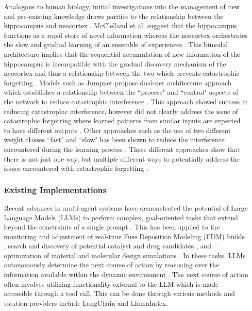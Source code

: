 Analogous to human biology, initial investigations into the management of new
and pre-existing knowledge draws parities to the relationship between the
hippocampus and neocortex \cite{mcclelland_why_1995, french_catastrophic_1999}.
McClelland et al. \cite{mcclelland_why_1995} suggest that the hippocampus
functions as a rapid store of novel information whereas the neocortex
orchestrates the slow and gradual learning of an ensemble of experiences
\cite{mcclelland_why_1995}. This bimodal architecture implies that the
sequential accumulation of new information of the hippocampus is incompatible
with the gradual discovery mechanism of the neocortex and thus a relationship
between the two which prevents catastrophic forgetting
\cite{mcclelland_why_1995, french_catastrophic_1999}. Models such as Jumpnet
\cite{rueckl_jumpnet_1993} propose dual-net architecture approach which
establishes a relationship between the ``process" and ``control" aspects of the
network to reduce catastrophic interference \cite{french_catastrophic_1999}.
This approach showed success in reducing catastrophic interference, however did
not clearly address the issue of catastrophic forgetting where learned patterns
from similar inputs are expected to have different outputs
\cite{french_catastrophic_1999}. Other approaches such as the use of two
different weight classes ``fast" and ``slow" has been shown to reduce the
interference encountered during the learning process \cite{hinton_using_1987,
french_catastrophic_1999}. These different approaches show that there is not
just one way, but multiple different ways to potentially address the issues
encountered with catastrophic forgetting \cite{french_catastrophic_1999}.

\subsubsection{Existing Implementations}
Recent advances in multi-agent systems have demonstrated the potential of Large
Language Models (LLMs) to perform complex, goal-oriented tasks that extend
beyond the constraints of a single prompt \cite{jadhav_llm-3d_2025,
ock_catalyst_2023, ock_large_2025, chaudhari_modular_2026, george_llm_2025,
bartsch_llm-craft_2025, chandrasekhar_automating_2025, merrill_llm-drone_2025}.
This has been applied to the monitoring and adjustment of real-time Fuse
Deposition Modeling (FDM) builds \cite{jadhav_llm-3d_2025}, search and discovery
of potential catalyst and drug candidates \cite{ock_catalyst_2023,
ock_large_2025}, and optimization of material and molecular design simulations
\cite{chaudhari_modular_2026, chandrasekhar_automating_2025}. In these tasks,
LLMs autonomously determine the next course of action by reasoning over the
information available within the dynamic environment \cite{jadhav_llm-3d_2025,
chaudhari_modular_2026, ock_large_2025}. The next course of action often
involves utilizing functionality external to the LLM which is made accessible
through a tool call. This can be done through various methods and solution
providers include LangChain and LlamaIndex.

